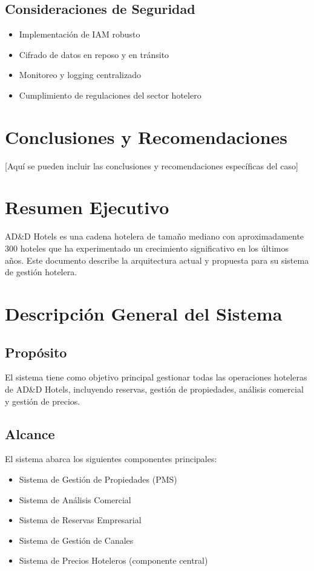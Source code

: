 \documentclass[12pt,a4paper]{article}
\begin{document}
\subsection{Consideraciones de Seguridad}
\begin{itemize}
    \item Implementación de IAM robusto
    \item Cifrado de datos en reposo y en tránsito
    \item Monitoreo y logging centralizado
    \item Cumplimiento de regulaciones del sector hotelero
\end{itemize}

\section{Conclusiones y Recomendaciones}
[Aquí se pueden incluir las conclusiones y recomendaciones específicas del caso]

\section{Resumen Ejecutivo}
AD\&D Hotels es una cadena hotelera de tamaño mediano con aproximadamente 300 hoteles que ha experimentado un crecimiento significativo en los últimos años. Este documento describe la arquitectura actual y propuesta para su sistema de gestión hotelera.

\section{Descripción General del Sistema}
\subsection{Propósito}
El sistema tiene como objetivo principal gestionar todas las operaciones hoteleras de AD\&D Hotels, incluyendo reservas, gestión de propiedades, análisis comercial y gestión de precios.

\subsection{Alcance}
El sistema abarca los siguientes componentes principales:
\begin{itemize}
    \item Sistema de Gestión de Propiedades (PMS)
    \item Sistema de Análisis Comercial
    \item Sistema de Reservas Empresarial
    \item Sistema de Gestión de Canales
    \item Sistema de Precios Hoteleros (componente central)
\end{itemize}
\end{document}
